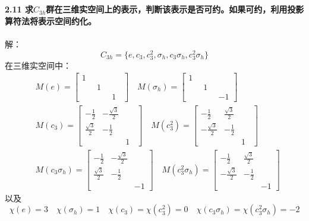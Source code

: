 \documentclass[12pt]{article}
\numberwithin{equation}{section}	 %
\begin{document}
\begin{spacing}{1.5}
~\\
~\\
\textbf{2.11 \quad 求$C_{3h}$群在三维实空间上的表示，判断该表示是否可约。如果可约，利用投影算符法将表示空间约化。}\\
~\\
解：
\begin{equation}
C_{3h} = \{e, c_{3}, c_{3}^{2}, \sigma_{h}, c_{3}\sigma_{h}, c_{3}^{2}\sigma_{h}\}
\end{equation}
在三维实空间中：
\begin{align*}
&M(e) = \begin{bmatrix} 1 & \quad & \quad \\ \quad & 1 & \quad \\ \quad & \quad & 1 \end{bmatrix} \quad M(\sigma_{h}) = \begin{bmatrix} 1 & \quad & \quad \\ \quad & 1 & \quad \\ \quad & \quad & -1 \end{bmatrix} \\
&M(c_{3}) = \begin{bmatrix} -\frac{1}{2} & -\frac{\sqrt{3}}{2} & \quad \\ \frac{\sqrt{3}}{2} & -\frac{1}{2} & \quad \\ \quad & \quad & 1 \end{bmatrix} \quad M(c_{3}^{2}) = \begin{bmatrix} -\frac{1}{2} & \frac{\sqrt{3}}{2} & \quad \\ -\frac{\sqrt{3}}{2} & -\frac{1}{2} & \quad \\ \quad & \quad & 1 \end{bmatrix} \\
&M(c_{3}\sigma_{h}) = \begin{bmatrix} -\frac{1}{2} & -\frac{\sqrt{3}}{2} & \quad \\ \frac{\sqrt{3}}{2} & -\frac{1}{2} & \quad \\ \quad & \quad & -1 \end{bmatrix} \quad M(c_{3}^{2}\sigma_{h}) = \begin{bmatrix} -\frac{1}{2} & \frac{\sqrt{3}}{2} & \quad \\ -\frac{\sqrt{3}}{2} & -\frac{1}{2} & \quad \\ \quad & \quad & -1 \end{bmatrix}
\end{align*}
以及\\
$$\chi(e)=3 \quad \chi(\sigma_{h})=1 \quad \chi(c_{3}) = \chi(c_{3}^{2}) = 0 \quad \chi(c_{3}\sigma_{h}) = \chi(c_{3}^{2}\sigma_{h}) = -2$$

\end{spacing}
\end{document}
